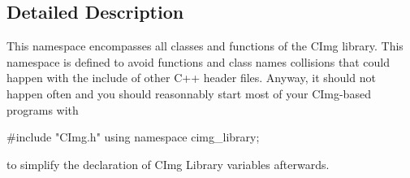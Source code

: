 \subsection{Detailed Description}
This namespace encompasses all classes and functions of the CImg library. This namespace is defined to avoid functions and class names collisions that could happen with the include of other C++ header files. Anyway, it should not happen often and you should reasonnably start most of your CImg-\/based programs with 
\begin{DoxyCode}
   #include "CImg.h"
   using namespace cimg_library;
\end{DoxyCode}
 to simplify the declaration of CImg Library variables afterwards. 
